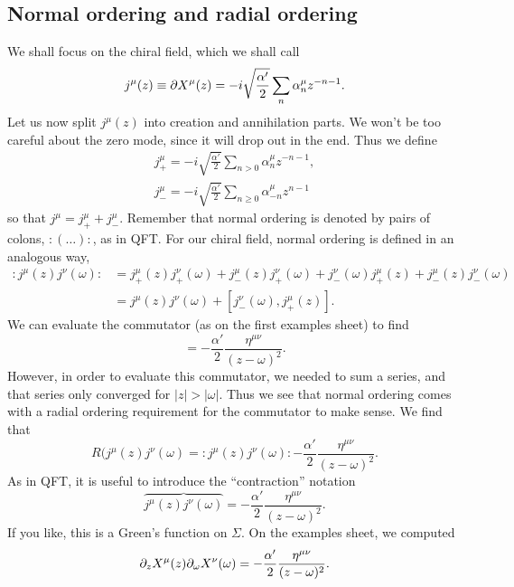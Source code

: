 \subsection*{Normal ordering and radial ordering}
We shall focus on the chiral field, which we shall call 
\begin{equation}
    j^\mu(z) \equiv \partial X^\mu(z)=-i\sqrt{\frac{\alpha'}{2}} \sum_n \alpha_n^\mu z^{-n-1}.
\end{equation}
Let us now split $j^\mu(z)$ into creation and annihilation parts. We won't be too careful about the zero mode, since it will drop out in the end. Thus we define
\begin{gather}
    j_+^\mu =-i\sqrt{\frac{\alpha'}{2}}
    \sum_{n>0} \alpha_n^\mu z^{-n-1},\\
    j_-^\mu =-i\sqrt{\frac{\alpha'}{2}}
    \sum_{n\geq 0} \alpha_{-n}^\mu z^{n-1}
\end{gather}
so that $j^\mu=j^\mu_+ + j^\mu_-.$ Remember that normal ordering is denoted by pairs of colons, $:(\ldots):$, as in QFT. For our chiral field, normal ordering is defined in an analogous way,
\begin{align}
    :j^\mu(z) j^\nu(\omega): &= j_+^\mu(z) j_+^\nu(\omega) + j_-^\mu(z) j_+^\nu(\omega)
    + j_-^\nu(\omega) j_+^\mu(z) + j_-^\mu(z) j_-^\nu(\omega)\\
    &= j^\mu(z) j^\nu(\omega) + [j_-^\nu(\omega),j_+^\mu (z)].
\end{align}
We can evaluate the commutator (as on the first examples sheet) to find
\begin{equation}
    [j_-^\nu(\omega,j_+^\mu(z)] =-\frac{\alpha'}{2} \frac{\eta^{\mu\nu}}{(z-\omega)^2}.
\end{equation}
However, in order to evaluate this commutator, we needed to sum a series, and that series only converged for $|z|>|\omega|$. Thus we see that normal ordering comes with a radial ordering requirement for the commutator to make sense. We find that
\begin{equation}
    R(j^\mu(z) j^\nu(\omega)=:j^\mu(z) j^\nu(\omega): -\frac{\alpha'}{2} \frac{\eta^{\mu\nu}}{(z-\omega)^2}.
\end{equation}
As in QFT, it is useful to introduce the ``contraction'' notation
\begin{equation}
    \overbrace{j^\mu(z) j^\nu(\omega)}=-\frac{\alpha'}{2} \frac{\eta^{\mu\nu}}{(z-\omega)^2}.
\end{equation}
If you like, this is a Green's function on $\Sigma$. On the examples sheet, we computed
\begin{equation}
    \partial_z X^\mu(z) \partial_\omega X^\nu(\omega)=-\frac{\alpha'}{2} \frac{\eta^{\mu\nu}}{(z-\omega)^2}.
\end{equation}
